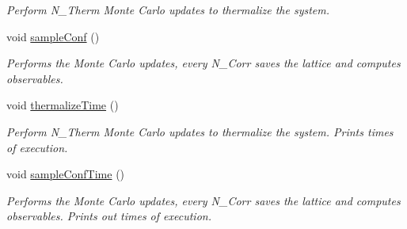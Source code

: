 \begin{DoxyCompactItemize}
\begin{DoxyCompactList}\small\item\em Perform N\+\_\+\+Therm Monte Carlo updates to thermalize the system. \end{DoxyCompactList}\item 
void \hyperlink{classGaugeFieldFactory_a37df236572b4c1adf1a00d3d1374621a}{sample\+Conf} ()\hypertarget{classGaugeFieldFactory_a37df236572b4c1adf1a00d3d1374621a}{}\label{classGaugeFieldFactory_a37df236572b4c1adf1a00d3d1374621a}

\begin{DoxyCompactList}\small\item\em Performs the Monte Carlo updates, every N\+\_\+\+Corr saves the lattice and computes observables. \end{DoxyCompactList}\item 
void \hyperlink{classGaugeFieldFactory_aaacc047577bbb5d0fcb790525d8ff958}{thermalize\+Time} ()\hypertarget{classGaugeFieldFactory_aaacc047577bbb5d0fcb790525d8ff958}{}\label{classGaugeFieldFactory_aaacc047577bbb5d0fcb790525d8ff958}

\begin{DoxyCompactList}\small\item\em Perform N\+\_\+\+Therm Monte Carlo updates to thermalize the system. Prints times of execution. \end{DoxyCompactList}\item 
void \hyperlink{classGaugeFieldFactory_adc5d83defde9295cdc32c9c4ec59af59}{sample\+Conf\+Time} ()\hypertarget{classGaugeFieldFactory_adc5d83defde9295cdc32c9c4ec59af59}{}\label{classGaugeFieldFactory_adc5d83defde9295cdc32c9c4ec59af59}

\begin{DoxyCompactList}\small\item\em Performs the Monte Carlo updates, every N\+\_\+\+Corr saves the lattice and computes observables. Prints out times of execution. \end{DoxyCompactList}\end{DoxyCompactItemize}
